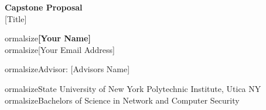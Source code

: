 \documentclass{article}
\begin{document}
	\begin{center}
    
    
		\LARGE{\textbf{Capstone Proposal}} \\
        \vspace{1em}
        \Large{[Title]} \\
        \vspace{1em}
        
ormalsize\textbf{[Your Name]} \\
        
ormalsize{[Your Email Address]} \\
        \vspace{1em}
        
ormalsize{Advisor: [Advisors Name]} \\
        \vspace{1em}
        
ormalsize{State University of New York Polytechnic Institute, Utica NY} \\
        
ormalsize{Bachelors of Science in Network and Computer Security}
     
	\end{center}
\end{document}
